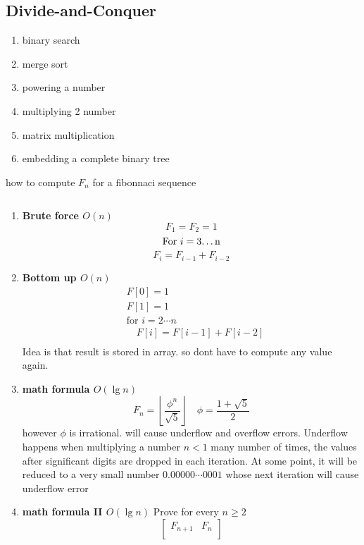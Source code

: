 \documentclass[11pt]{article}
\begin{document}
\subsection*{Divide-and-Conquer}

\begin{enumerate}
  \item binary search
  \item merge sort
  \item powering a number
  \item multiplying 2 number
  \item matrix multiplication
  \item embedding a complete binary tree
\end{enumerate}

\begin{example} how to compute $F_n$ for a fibonnaci sequence
\begin{solution}
  $ $\\
  \begin{enumerate}
    \item \textbf{Brute force $O(n)$}
    \[
      F_1 = F_2 = 1
    \]
    \[
      \text{For $i = 3$\dots n}
    \]
    \[
      F_i = F_{i-1} + F_{i-2}
    \]
    \item \textbf{Bottom up $O(n)$}
    \begin{align}
      &F[0] = 1\\
      &F[1] = 1\\
      &\text{for } i = 2\cdots n\\
      &\quad F[i] = F[i-1] + F[i-2]\\
    \end{align}
    Idea is that result is stored in array. so dont have to compute any value again.
    \item \textbf{math formula $O(\lg n)$}
    \[
      F_n = \left\lfloor \frac{\phi^n}{\sqrt{5}} \right\rfloor \quad \phi = \frac{1 + \sqrt{5}}{2}
    \]
    however $\phi$ is irrational. will cause underflow and overflow errors. Underflow happens when multiplying a number $n < 1$ many number of times, the values after significant digits are dropped in each iteration. At some point, it will be reduced to a very small number $0.00000\cdots 0001$ whose next iteration will cause underflow error
    \item \textbf{math formula II $O(\lg n)$}
    Prove for every $n\geq 2$
    \[
      \begin{bmatrix}
        F_{n+1} & F_{n} \\

\end{bmatrix}\]
\end{enumerate}
\end{solution}
\end{example}
\end{document}
